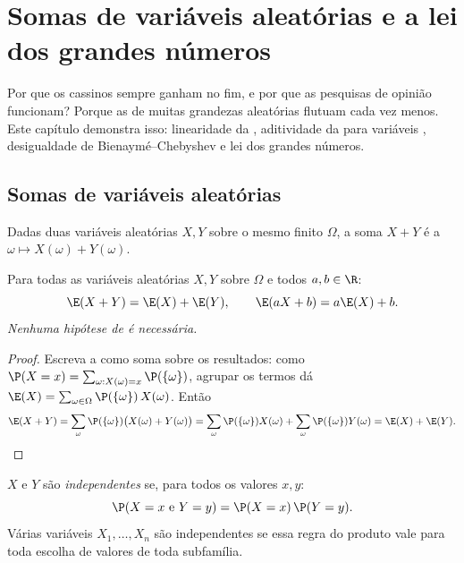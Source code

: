 \chapter{Somas de variáveis aleatórias e a lei dos grandes números}\label{ch:g12:sums}

Por que os cassinos sempre ganham no fim, e por que as pesquisas de
opinião funcionam? Porque as  de muitas grandezas aleatórias
 flutuam cada vez menos. Este capítulo demonstra isso:
linearidade da , aditividade da  para variáveis
, desigualdade de Bienaymé--Chebyshev e lei dos grandes
números.

\section{Somas de variáveis aleatórias}

Dadas duas variáveis aleatórias $X, Y$ sobre o mesmo 
finito $\Omega$, a soma $X + Y$ é a 
$\omega \mapsto X(\omega) + Y(\omega)$.

\begin{theorem}\label{thm:g12:sums:linearity}
Para todas as variáveis aleatórias $X, Y$ sobre $\Omega$ e todos
$a, b \in \R$:
\[
\E(X + Y) = \E(X) + \E(Y), \qquad \E(aX + b) = a\E(X) + b .
\]
\emph{Nenhuma hipótese de  é necessária.}
\end{theorem}

\begin{proof}
Escreva a  como soma sobre os resultados: como
$\P(X = x) = \sum_{\omega : X(\omega) = x} \P(\{\omega\})$, agrupar os
termos dá $\E(X) = \sum_{\omega \in \Omega} \P(\{\omega\})\,X(\omega)$.
Então
\[
\E(X + Y) = \sum_{\omega} \P(\{\omega\})\bigl(X(\omega) + Y(\omega)\bigr)
= \sum_{\omega} \P(\{\omega\})X(\omega)
+ \sum_{\omega} \P(\{\omega\})Y(\omega) = \E(X) + \E(Y). \qedhere
\]
\end{proof}

\begin{definition}\label{def:g12:sums:indep}
$X$ e $Y$ são \emph{independentes}
se, para todos os valores $x, y$:
\[
\P(X = x \text{ e } Y = y) = \P(X = x)\,\P(Y = y).
\]
Várias variáveis $X_1, \dots, X_n$ são independentes se essa regra do
produto vale para toda escolha de valores de toda subfamília.
\end{definition}


